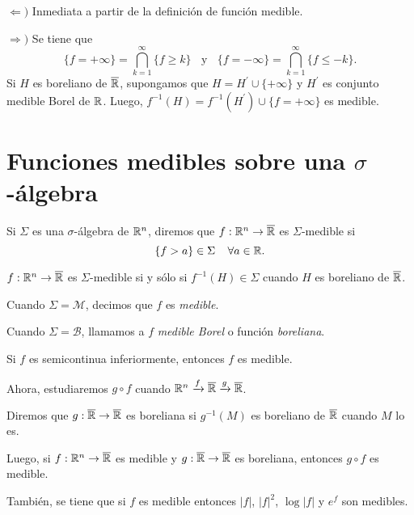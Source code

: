 \begin{demo}
$\Leftarrow)$ Inmediata a partir de la definici\'on de funci\'on medible.

$\Rightarrow)$ Se tiene que 
\[
\{f=+\infty\}=\bigcap\limits_{k=1}^{\infty} \{f \geq k\}
\;\;\mbox{ y }\;\;
\{f=-\infty\}=\bigcap\limits_{k=1}^{\infty} \{f \leq -k\}.
\]
Si $H$ es boreliano de $\overline{\mathbb{R}}$, supongamos que $H=H^{'}\cup \{+\infty\}$ y $H^{'}$ es conjunto medible Borel de $\mathbb{R}$.
Luego, $f^{-1}(H)=f^{-1}(H^{'})\cup \{f=+\infty\}$ es medible.
\end{demo}


\section{Funciones medibles sobre una $\sigma$-\'algebra}

\begin{definicion}{}
Si $\Sigma$ es una $\sigma$-\'algebra de $\mathbb{R}^n$, diremos que $f:\mathbb{R}^n\to \overline{\mathbb{R}}$ es $\Sigma$-medible si 
\[\{f>a\} \in \Sigma\;\;\;\;\forall a \in \mathbb{R}.\]
\end{definicion}

\begin{proposicion}{}
$f:\mathbb{R}^n \to \overline{\mathbb{R}}$ es $\Sigma$-medible si y s\'olo si
$f^{-1}(H)\in \Sigma$ cuando $H$ es boreliano de $\overline{\mathbb{R}}$.
\end{proposicion}

Cuando $\Sigma=\mathscr{M}$, decimos que $f$ es \emph{medible}.

Cuando $\Sigma=\mathscr{B}$, llamamos a $f$ \emph{medible Borel} 
o funci\'on \emph{boreliana}.

\begin{ejercicio}{}
Si $f$ es semicontinua inferiormente, entonces $f$ es medible. 
\end{ejercicio}

Ahora, estudiaremos $g\circ f$ cuando 
$\mathbb{R}^n \xrightarrow{f}\overline{\mathbb{R}} \xrightarrow {g} \overline{\mathbb{R}}$.

\begin{definicion}{}
Diremos que $g: \overline{\mathbb{R}} \to \overline{\mathbb{R}}$ es boreliana si $g^{-1}(M)$ es boreliano de $\overline{\mathbb{R}}$ cuando $M$ lo es.
\end{definicion}

Luego, si $f:\mathbb{R}^n \to \overline{\mathbb{R}}$ es medible y $g:\overline{\mathbb{R}} \to \overline{\mathbb{R}}$ es boreliana, entonces $g\circ f$ es medible.

Tambi\'en, se tiene que si $f$ es medible entonces $|f|$, $|f|^2$, $\log|f|$ y $e^f$ son medibles. 

